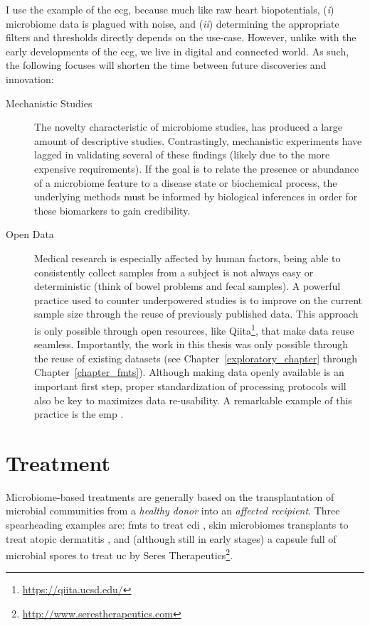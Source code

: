I use the example of the \gls{ecg}, because much like raw heart biopotentials,
(\textit{i}) microbiome data is plagued with noise, and (\textit{ii})
determining the appropriate filters and thresholds directly depends on the
use-case. However, unlike with the early developments of the \gls{ecg}, we live
in digital and connected world. As such, the following focuses will
shorten the time between future discoveries and innovation:

\begin{description}
    \item[Mechanistic Studies]The novelty characteristic of microbiome studies, 
        has produced a large amount of descriptive studies. Contrastingly, 
        mechanistic experiments have lagged in validating several of these 
        findings (likely due to the more expensive requirements).  If the goal 
        is to relate the presence or abundance of a microbiome feature to a
        disease state or biochemical process, the underlying methods must be 
        informed by biological inferences in order for these biomarkers to gain 
        credibility.

    \item[Open Data]Medical research is especially affected by human factors, 
        being able to consistently collect samples from a subject is not always 
        easy or deterministic (think of bowel problems and fecal samples). A 
        powerful practice used to counter underpowered studies is to improve on 
        the current sample size through the reuse of previously published data.  
        This approach is only possible through open resources, like 
        Qiita\footnote{\url{https://qiita.ucsd.edu/}}, that make data reuse 
        seamless. Importantly, the work in this thesis was only possible 
        through the reuse of existing datasets (see 
        Chapter~\ref{exploratory_chapter} through Chapter~\ref{chapter_fmts}).  
        Although making data openly available is an important first step, 
        proper standardization of processing protocols will also be key to 
        maximizes data re-usability. A remarkable example of this practice is 
        the \gls{emp} \cite{RN4267}.
\end{description}

\section{Treatment}

Microbiome\hyp{}based treatments are generally based on the transplantation of 
microbial communities from a \textit{healthy donor} into an \textit{affected 
recipient}. Three spearheading examples are: \glspl{fmt} to treat 
\gls{cdi} \cite{RN4129}, skin microbiomes transplants to treat atopic 
dermatitis \cite{GalloSkin}, and (although still in early stages) a capsule 
full of microbial spores to treat \gls{uc} by Seres 
Therapeutics\footnote{\url{http://www.serestherapeutics.com}}.


